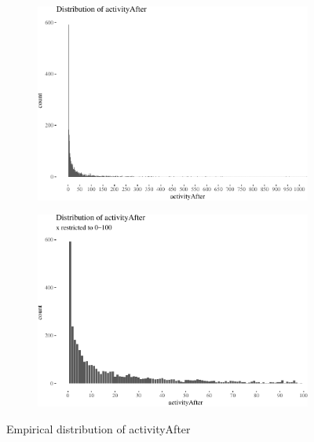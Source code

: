 \documentclass[10pt,]{scrartcl}
\begin{document}
\begin{figure}
\begin{subfigure}[b]{0.45\textwidth}

\begin{center}\includegraphics[width=1\linewidth]{redditAnalysisWalkthrough_files/figure-latex/unnamed-chunk-68-1} \end{center}
\end{subfigure}
\begin{subfigure}[b]{0.45\textwidth}

\begin{center}\includegraphics[width=1\linewidth]{redditAnalysisWalkthrough_files/figure-latex/unnamed-chunk-69-1} \end{center}
\end{subfigure}
\caption{Empirical distribution of activityAfter}
\label{fig:activityDistro}
\end{figure}
\end{document}
